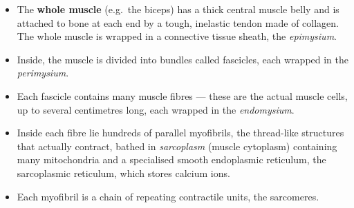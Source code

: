 \documentclass[11pt]{article}
\newcommand{\cle}[1]{{\popxbold\color{popdark}#1}}
\begin{document}
\begin{itemize}
\item The \textbf{whole muscle} (e.g.\ the biceps) has a thick central \cle{muscle belly} and is attached to bone at each end by a tough, inelastic \cle{tendon} made of collagen. The whole muscle is wrapped in a connective tissue sheath, the \emph{epimysium}.
\item Inside, the muscle is divided into bundles called \cle{fascicles}, each wrapped in the \emph{perimysium}.
\item Each fascicle contains many \cle{muscle fibres} — these are the actual muscle cells, up to several centimetres long, each wrapped in the \emph{endomysium}.
\item Inside each fibre lie hundreds of parallel \cle{myofibrils}, the thread-like structures that actually contract, bathed in \emph{sarcoplasm} (muscle cytoplasm) containing many mitochondria and a specialised smooth endoplasmic reticulum, the \cle{sarcoplasmic reticulum}, which stores calcium ions.
\item Each myofibril is a chain of repeating contractile units, the \cle{sarcomeres}.
\end{itemize}
\end{document}
